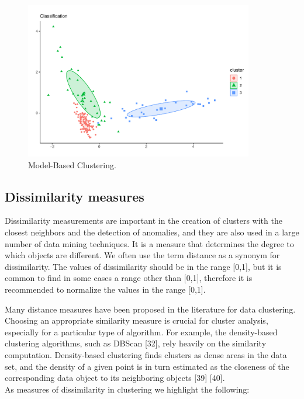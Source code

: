 \documentclass[
]{article}
\begin{document}
\begin{itemize}
  \begin{figure}
  \centering
  \includegraphics[width=\textwidth,height=2.70833in]{img/model.pdf}
  \caption{Model-Based Clustering. \label{model}}
  \end{figure}

  \newpage
\end{itemize}

\hypertarget{dissimilarity-measures}{%
\subsection{Dissimilarity measures}\label{dissimilarity-measures}}

Dissimilarity measurements are important in the creation of clusters
with the closest neighbors and the detection of anomalies, and they are
also used in a large number of data mining techniques. It is a measure
that determines the degree to which objects are different. We often use
the term distance as a synonym for dissimilarity. The values of
dissimilarity should be in the range {[}0,1{]}, but it is common to find
in some cases a range other than {[}0,1{]}, therefore it is recommended
to normalize the values in the range {[}0,1{]}.

Many distance measures have been proposed in the literature for data
clustering. Choosing an appropriate similarity measure is crucial for
cluster analysis, especially for a particular type of algorithm. For
example, the density-based clustering algorithms, such as DBScan
{[}32{]}, rely heavily on the similarity computation. Density-based
clustering finds clusters as dense areas in the data set, and the
density of a given point is in turn estimated as the closeness of the
corresponding data object to its neighboring objects {[}39{]}
{[}40{]}.\\
As measures of dissimilarity in clustering we highlight the following:
\end{document}
